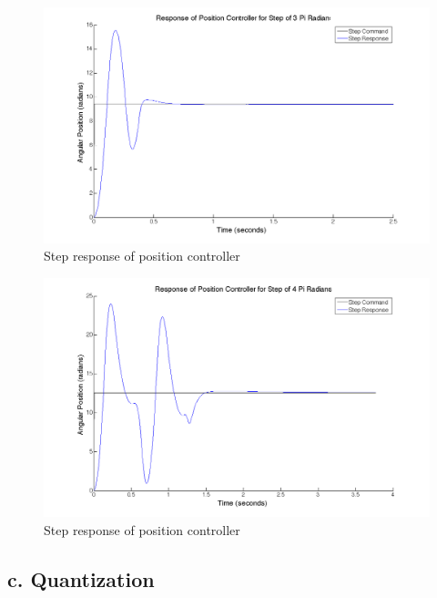 \documentclass{article}
\theoremstyle{plain}
\theoremstyle{definition}
\theoremstyle{remark}
\begin{document}
\begin{figure}[htb]
\begin{center}
\includegraphics[width = 14cm]{posstep_3pi.png}
\caption{Step response of position controller}
\label{q5_b4}
\end{center}
\end{figure}

\begin{figure}[htb]
\begin{center}
\includegraphics[width = 14cm]{posstep_4pi.png}
\caption{Step response of position controller}
\label{q5_b5}
\end{center}
\end{figure}

\clearpage

\subsection*{c. Quantization}
\end{document}

